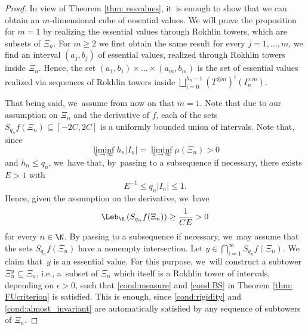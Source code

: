 \begin{proof}
In view of Theorem \ref{thm: essvalues}, it~is enough to show that we can
obtain an $m$\nobreakdash-dimensional cube of essential values. We will prove the
proposition for $m=1$ by realizing the essential values through Rokhlin
towers, which are subsets of $\Xi_n$. For $m\ge 2$ we first obtain the
same result for every $j=1,\ldots,m$, \ie we find an interval $(a_j,b_j)$
of essential values, realized through Rokhlin towers inside $\Xi_n$. Hence,
the set $(a_1,b_1)\times\ldots\times(a_m,b_m)$ is the set of essential
values realized via sequences of Rokhlin towers inside
$\bigsqcup_{i=0}^{h_n-1}(T^{\otimes m})^i(I_n^{\times m})$.

That being said, we~assume from now on that $m=1$. Note that due to our assumption on $\Xi_n$ and the derivative of $f$, each of the sets $S_{q_n}f(\Xi_n)\subseteq [-2C,2C]$ is a uniformly bounded union of intervals. Note that, since
\[
\liminf_{n\to\infty} h_n |I_n| = \liminf_{n\to\infty}\mu(\Xi_n) > 0
\]
and $h_n\le q_n$, we~have that, by~passing to a subsequence if necessary, there exists $E>1$ with
\[
E^{-1}\le q_n|I_n|\le 1.
\]
Hence, given the assumption on the derivative, we~have
\[
\Leb_{\R}\left(S_{q_n}f(\Xi_n)\right)\ge \frac{1}{CE}>0
\]
for every $n\in\N$.
By passing to a subsequence if necessary, we~may assume that the sets $S_{q_n}f(\Xi_n)$ have a nonempty intersection. Let $y\in \bigcap_{i=1}^{\infty} S_{q_n}f(\Xi_n)$. We claim that~$y$ is an essential value. For this purpose, we~will construct a subtower $\Xi_{n}^{y}\subseteq \Xi_n$, i.e., a~subset of $\Xi_n$ which itself is a Rokhlin tower of intervals, depending on $\epsilon>0$, such that \eqref{cond:measure} and \eqref{cond:BS} in Theorem \ref{thm: FUcriterion} is satisfied. This is enough, since \eqref{cond:rigidity} and \eqref{cond:almost_invariant} are automatically satisfied by any sequence of subtowers of $\Xi_n$.


\end{proof}
